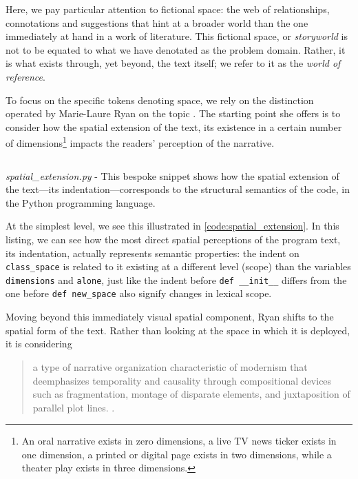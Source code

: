 Here, we pay particular attention to fictional space: the web of relationships, connotations and suggestions that hint at a broader world than the one immediately at hand in a work of literature. This fictional space, or \emph{storyworld} is not to be equated to what we have denotated as the problem domain. Rather, it is what exists through, yet beyond, the text itself; we refer to it as the \emph{world of reference}.

To focus on the specific tokens denoting space, we rely on the distinction operated by Marie-Laure Ryan on the topic \citep{ryan_space_2009}. The starting point she offers is to consider how the spatial extension of the text, its existence in a certain number of dimensions\footnote{An oral narrative exists in zero dimensions, a live TV news ticker exists in one dimension, a printed or digital page exists in two dimensions, while a theater play exists in three dimensions.} impacts the readers' perception of the narrative.

\begin{listing}
    \inputminted[]{python}{./corpus/spatial_extension.py}
    \caption{\emph{spatial\_extension.py} - This bespoke snippet shows how the spatial extension of the text—its indentation—corresponds to the structural semantics of the code, in the Python programming language.}
    \label{code:spatial_extension}
\end{listing}

At the simplest level, we see this illustrated in \autoref{code:spatial_extension}. In this listing, we can see how the most direct spatial perceptions of the program text, its indentation, actually represents semantic properties: the indent on \lstinline{class_space} is related to it existing at a different level (scope) than the variables \lstinline{dimensions} and \lstinline{alone}, just like the indent before \lstinline{def __init__} differs from the one before \lstinline{def new_space} also signify changes in lexical scope.

Moving beyond this immediately visual spatial component, Ryan shifts to the spatial form of the text. Rather than looking at the space in which it is deployed, it is considering

\begin{quote}
    a type of narrative organization characteristic of modernism that deemphasizes temporality and causality through compositional devices such as fragmentation, montage of disparate elements, and juxtaposition of parallel plot lines. \citep{ryan_space_2009}.
\end{quote}


